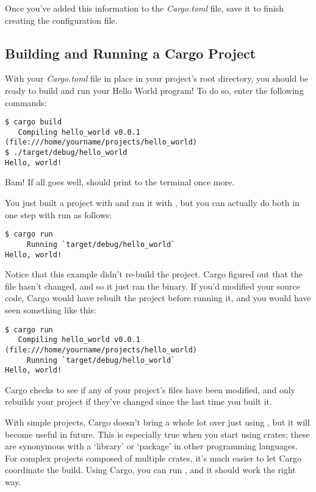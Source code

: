 \blank

Once you've added this information to the \emph{Cargo.toml} file, save it to finish creating the configuration file.

\subsection*{Building and Running a Cargo Project}

With your \emph{Cargo.toml} file in place in your project's root directory, you should be ready to build and run your 
Hello World program! To do so, enter the following commands:

\begin{verbatim}
$ cargo build
   Compiling hello_world v0.0.1 (file:///home/yourname/projects/hello_world)
$ ./target/debug/hello_world
Hello, world! 
\end{verbatim}

Bam! If all goes well,  should print to the terminal once more.

\blank

You just built a project with  and ran it with , but you can actually do 
both in one step with  run as follows:

\begin{verbatim}
$ cargo run
     Running `target/debug/hello_world`
Hello, world!  
\end{verbatim}

Notice that this example didn’t re-build the project. Cargo figured out that the file hasn’t changed, and so it just 
ran the binary. If you'd modified your source code, Cargo would have rebuilt the project before running it, and you 
would have seen something like this:

\begin{verbatim}
$ cargo run
   Compiling hello_world v0.0.1 (file:///home/yourname/projects/hello_world)
     Running `target/debug/hello_world`
Hello, world!  
\end{verbatim}

Cargo checks to see if any of your project’s files have been modified, and only rebuilds your project if they’ve changed since 
the last time you built it.

\blank

With simple projects, Cargo doesn't bring a whole lot over just using , but it will become useful in future. This 
is especially true when you start using crates; these are synonymous with a ‘library’ or ‘package’ in other programming languages. 
For complex projects composed of multiple crates, it’s much easier to let Cargo coordinate the build. Using Cargo, you can run 
, and it should work the right way.

